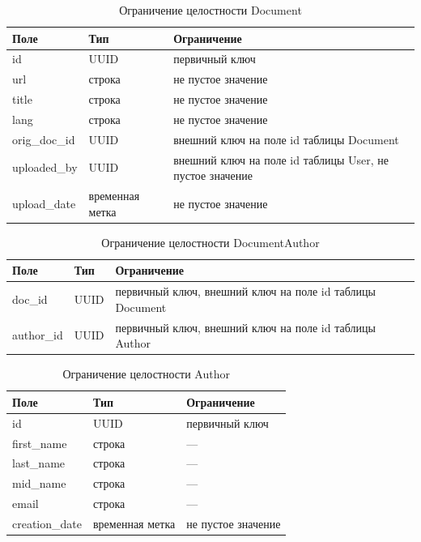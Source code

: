 \begin{table}[H]
\centering
\caption{Ограничение целостности Document}
\begin{tabular}{|m{3cm}|m{3cm}|m{6cm}|}
\hline
\textbf{Поле} & \textbf{Тип} & \textbf{Ограничение} \\ \hline
id & UUID & первичный ключ \\ \hline
url & строка & не пустое значение \\ \hline
title & строка & не пустое значение \\ \hline
lang & строка & не пустое значение \\ \hline
orig\_doc\_id & UUID & внешний ключ на поле id таблицы Document \\ \hline
uploaded\_by & UUID & внешний ключ на поле id таблицы User, не пустое значение \\ \hline
upload\_date & временная метка & не пустое значение \\ \hline
\end{tabular}
\label{tab:doc}
\end{table}

\begin{table}[H]
\centering
\caption{Ограничение целостности DocumentAuthor}
\begin{tabular}{|m{3cm}|m{3cm}|m{6cm}|}
\hline
\textbf{Поле} & \textbf{Тип} & \textbf{Ограничение} \\ \hline
doc\_id & UUID & первичный ключ, внешний ключ на поле id таблицы Document \\ \hline
author\_id & UUID & первичный ключ, внешний ключ на поле id таблицы Author \\ \hline
\end{tabular}
\label{tab:docauthor}
\end{table}

\begin{table}[H]
\centering
\caption{Ограничение целостности Author}
\begin{tabular}{|m{3cm}|m{3cm}|m{6cm}|}
\hline
\textbf{Поле} & \textbf{Тип} & \textbf{Ограничение} \\ \hline
id & UUID & первичный ключ \\ \hline
first\_name & строка & --- \\ \hline
last\_name & строка & --- \\ \hline
mid\_name & строка & --- \\ \hline
email & строка & --- \\ \hline
creation\_date & временная метка & не пустое значение \\ \hline
\end{tabular}
\label{tab:author}
\end{table}

